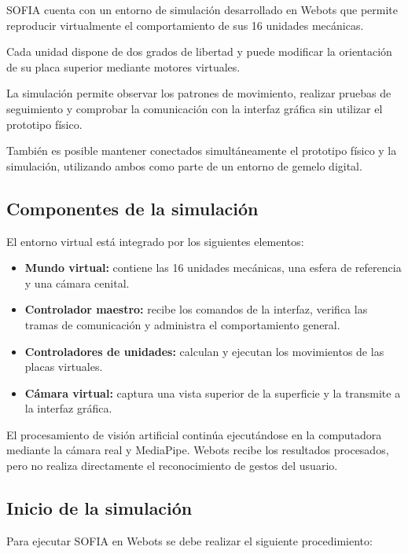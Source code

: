 \documentclass[letterpaper,journal]{IEEEtran}
\begin{document}
SOFIA cuenta con un entorno de simulación
desarrollado en Webots que permite reproducir
virtualmente el comportamiento de sus
16 unidades mecánicas.

Cada unidad dispone de dos grados de libertad
y puede modificar la orientación de su placa
superior mediante motores virtuales.

La simulación permite observar los patrones
de movimiento, realizar pruebas de seguimiento
y comprobar la comunicación con la interfaz
gráfica sin utilizar el prototipo físico.

También es posible mantener conectados
simultáneamente el prototipo físico y la
simulación, utilizando ambos como parte
de un entorno de gemelo digital.

\subsection{Componentes de la simulación}

El entorno virtual está integrado por los
siguientes elementos:

\begin{itemize}
    \item \textbf{Mundo virtual:} contiene
    las 16 unidades mecánicas, una esfera
    de referencia y una cámara cenital.

    \item \textbf{Controlador maestro:}
    recibe los comandos de la interfaz,
    verifica las tramas de comunicación
    y administra el comportamiento general.

    \item \textbf{Controladores de unidades:}
    calculan y ejecutan los movimientos
    de las placas virtuales.

    \item \textbf{Cámara virtual:} captura
    una vista superior de la superficie
    y la transmite a la interfaz gráfica.
\end{itemize}

El procesamiento de visión artificial
continúa ejecutándose en la computadora
mediante la cámara real y MediaPipe.
Webots recibe los resultados procesados,
pero no realiza directamente el
reconocimiento de gestos del usuario.

\subsection{Inicio de la simulación}

Para ejecutar SOFIA en Webots se debe
realizar el siguiente procedimiento:
\end{document}
